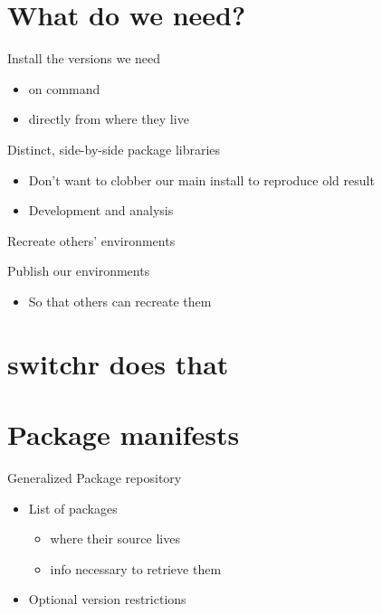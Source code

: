 \documentclass[presentation]{beamer}
\begin{document}
\section{What do we need?}
\label{sec-3}
\begin{frame}[label=sec-3-1]{Install the versions we need}
\begin{itemize}
\item on command
\item directly from where they live
\end{itemize}
\end{frame}
\begin{frame}[label=sec-3-2]{Distinct, side-by-side package libraries}
\begin{itemize}
\item Don't want to clobber our main install to reproduce old result
\item Development and analysis
\end{itemize}
\end{frame}
\begin{frame}[label=sec-3-3]{Recreate others' environments}
\end{frame}
\begin{frame}[label=sec-3-4]{Publish our environments}
\begin{itemize}
\item So that others can recreate them
\end{itemize}
\end{frame}

\section{switchr does that}
\label{sec-4}

\section{Package manifests}
\label{sec-5}
\begin{frame}[label=sec-5-1]{Generalized Package repository}
\begin{itemize}
\item List of packages
\begin{itemize}
\item where their source lives
\item info necessary to retrieve them
\end{itemize}
\item Optional version restrictions
\end{itemize}
\end{frame}
\end{document}
